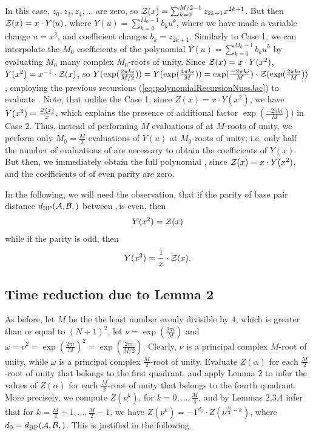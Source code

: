 \noindent
In this case, $z_0,z_2,z_4,\dots$ are zero, so
${\mathcal Z}_{}(x) = \sum_{k=0}^{M/2-1} z_{2k+1} x^{2k+1}$. But then
${\mathcal Z}_{}(x) = x \cdot Y(u)$, where
$Y(u)= \sum_{k=0}^{M_0-1} b_k u^k$, where we have made
a variable change $u=x^2$, and coefficient changes
$b_k = z_{2k+1}$. Similarly to Case 1,
we can interpolate the $M_0$ coefficients of the polynomial
$Y(u) = \displaystyle\sum_{k=0}^{M_0-1} b_k u^k$
by evaluating $M_0$ many complex $M_0$-roots
of unity.  Since ${\mathcal Z}_{}(x)=x \cdot Y(x^2)$, $Y(x^2) = x^{-1} \cdot {\mathcal Z}_{}(x)$,
so
$Y(\exp(\frac{2\pi ki}{M/2})) = Y(\exp(\frac{4\pi ki}{M})) =
\exp(\frac{-2\pi ki}{M}) \cdot
{\mathcal Z}_{}(\exp(\frac{2\pi ki}{M}))$, employing
the previous recursions (\ref{eq:polynomialRecursionNussJac})
to evaluate .  Note, that unlike the
Case 1, since $Z(x)=x \cdot Y(x^2)$, we have
$Y(x^2)=\frac{{\mathcal Z}_{}(x)}{x}$, which explains the presence of additional factor
$\exp(\frac{-2\pi ki}{M}))$ in Case 2.  Thus, instead of
performing $M$ evaluations of \emZ{} at $M$-roots of unity,
we perform only $M_0=\frac{M}{2}$ evaluations of $Y(u)$ at
$M_0$-roots of unity; i.e. only half the number of
evaluations of \emZ{} are necessary to
obtain the coefficients of $Y(x)$. But then, we immediately obtain the
full polynomial \emZ{}, since ${\mathcal Z}_{}(x) = x \cdot Y(x^2)$, and the
coefficients of \emZ{} of even parity are zero.

In the following, we will need the observation, that if the parity of
base pair distance $\dBP{\strA,\strB}$ between \strA,\,\strB is
even, then
\begin{align}
\label{eq:evenY}
Y(x^2) = \emZ{}
\end{align}
while if the parity is odd,
then
\begin{align}
\label{eq:oddY}
Y(x^2) = \frac{1}{x} \cdot \emZ{}.
\end{align}

\subsection{Time reduction due to Lemma 2}
As before, let $M$ be the the least number evenly divisible by $4$, which is
greater than or equal to $(N+1)^2$, let $\nu = \exp(\frac{2 \pi i}{M})$
and $\omega=\nu^2 = \exp(\frac{2 \pi i}{M})^2 =
\exp(\frac{2 \pi i}{M/2})$. Clearly, $\nu$ is a principal complex
$M$-root of unity, while $\omega$ is a principal complex $\frac{M}{2}$-root
of unity. Evaluate $Z(\alpha)$ for each $\frac{M}{2}$-root of unity
that belongs to the first quadrant, and apply Lemma 2 to infer the values
of $Z(\alpha)$ for each $\frac{M}{2}$-root of unity that belongs to the
fourth quadrant. More precisely,
we compute $Z(\nu^k)$, for $k=0,\dots,\frac{M}{4}$, and by Lemmas 2,3,4 infer
that for $k=\frac{M}{4}+1,\dots,\frac{M}{2}-1$, we have
$Z(\nu^{k})= -1^{d_0} \cdot \overline{Z(\nu^{\frac{M}{2}-k})}$, where
$d_0 = \dBP{\strA,\strB}$. This is justified in the following.

